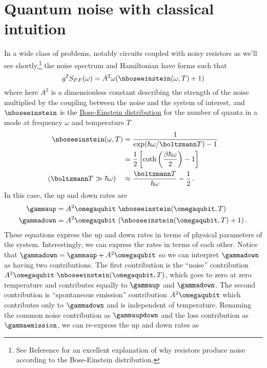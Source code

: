 \section{Quantum noise with classical intuition}

In a wide class of problems, notably circuits coupled with noisy resistors as we'll see shortly,\footnote{See Reference \cite{Nyquist:noise1928} for an excellent explanation of why resistors produce noise according to the Bose-Einstein distribution.} the noise spectrum and Hamiltonian have forms such that
\begin{equation}
  g^2 S_{FF}(\omega) = A^2 \omega (\nboseeinstein(\omega, T) + 1) \label{eq:noise_standard_form}
\end{equation}
where here $A^2$ is a dimensionless constant describing the strength of the noise multiplied by the coupling between the noise and the system of interest, and $\nboseeinstein$ is the \href{https://en.wikipedia.org/wiki/Bose\%E2\%80\%93Einstein_statistics}{Bose-Einstein distribution} for the number of quanta in a mode at frequency $\omega$ and temperature $T$
\begin{align}
  \nboseeinstein(\omega, T)
  &= \frac{1}{\exp(\hbar \omega / \boltzmann T) - 1} \\
  & = \frac{1}{2} \left[ \coth \left( \frac{\beta \hbar \omega}{2} \right) - 1 \right] \\
  (\boltzmann T \gg \hbar \omega) \quad & \approx \frac{\boltzmann T}{\hbar \omega} - \frac{1}{2}
  \, .
\end{align}
In this case, the up and down rates are
\begin{align}
    \gammaup & = A^2 \omegaqubit ~ \nboseeinstein(\omegaqubit, T) \\
    \gammadown &= A^2 \omegaqubit ~ (\nboseeinstein(\omegaqubit, T) + 1)
    \, .
\end{align}
These equations express the up and down rates in terms of physical parameters of the system.
Interestingly, we can express the rates in terms of each other.
Notice that $\gammadown = \gammaup + A^2 \omegaqubit$ so we can interpret $\gammadown$ as having two contributions.
The first contribution is the ``noise'' contribution $A^2 \omegaqubit ~ \nboseeinstein(\omegaqubit, T)$, which goes to zero at zero temperature and contributes equally to $\gammaup$ and $\gammadown$.
The second contribution is ``spontaneous emission'' contribution $A^2 \omegaqubit$ which contributes only to $\gammadown$ and is independent of temperature.
Renaming the common noise contribution as $\gammaupdown$ and the loss contribution as $\gammaemission$, we can re-express the up and down rates as
